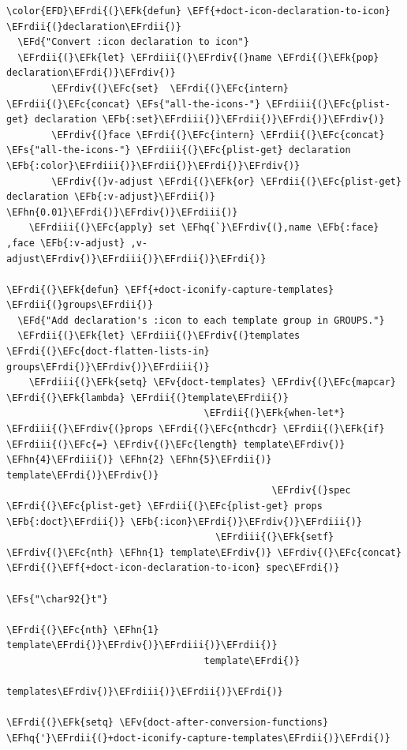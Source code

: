 \documentclass{scrartcl}
\newcommand{\EFk}[1]{\textcolor{EFk}{#1}} %
\newcommand{\EFd}[1]{\textcolor{EFd}{#1}} %
\newcommand{\EFs}[1]{\textcolor{EFs}{#1}} %
\newcommand{\EFb}[1]{\textcolor{EFb}{#1}} %
\newcommand{\EFc}[1]{\textcolor{EFc}{#1}} %
\newcommand{\EFv}[1]{\textcolor{EFv}{#1}} %
\newcommand{\EFf}[1]{\textcolor{EFf}{#1}} %
\newcommand{\EFhn}[1]{#1} %
\newcommand{\EFhq}[1]{#1} %
\newcommand{\EFrdi}[1]{#1} %
\newcommand{\EFrdii}[1]{#1} %
\newcommand{\EFrdiii}[1]{#1} %
\newcommand{\EFrdiv}[1]{#1} %
\begin{document}
\begin{Code}
\begin{Verbatim}[]
\color{EFD}\EFrdi{(}\EFk{defun} \EFf{+doct-icon-declaration-to-icon} \EFrdii{(}declaration\EFrdii{)}
  \EFd{"Convert :icon declaration to icon"}
  \EFrdii{(}\EFk{let} \EFrdiii{(}\EFrdiv{(}name \EFrdi{(}\EFk{pop} declaration\EFrdi{)}\EFrdiv{)}
        \EFrdiv{(}\EFc{set}  \EFrdi{(}\EFc{intern} \EFrdii{(}\EFc{concat} \EFs{"all-the-icons-"} \EFrdiii{(}\EFc{plist-get} declaration \EFb{:set}\EFrdiii{)}\EFrdii{)}\EFrdi{)}\EFrdiv{)}
        \EFrdiv{(}face \EFrdi{(}\EFc{intern} \EFrdii{(}\EFc{concat} \EFs{"all-the-icons-"} \EFrdiii{(}\EFc{plist-get} declaration \EFb{:color}\EFrdiii{)}\EFrdii{)}\EFrdi{)}\EFrdiv{)}
        \EFrdiv{(}v-adjust \EFrdi{(}\EFk{or} \EFrdii{(}\EFc{plist-get} declaration \EFb{:v-adjust}\EFrdii{)} \EFhn{0.01}\EFrdi{)}\EFrdiv{)}\EFrdiii{)}
    \EFrdiii{(}\EFc{apply} set \EFhq{`}\EFrdiv{(},name \EFb{:face} ,face \EFb{:v-adjust} ,v-adjust\EFrdiv{)}\EFrdiii{)}\EFrdii{)}\EFrdi{)}

\EFrdi{(}\EFk{defun} \EFf{+doct-iconify-capture-templates} \EFrdii{(}groups\EFrdii{)}
  \EFd{"Add declaration's :icon to each template group in GROUPS."}
  \EFrdii{(}\EFk{let} \EFrdiii{(}\EFrdiv{(}templates \EFrdi{(}\EFc{doct-flatten-lists-in} groups\EFrdi{)}\EFrdiv{)}\EFrdiii{)}
    \EFrdiii{(}\EFk{setq} \EFv{doct-templates} \EFrdiv{(}\EFc{mapcar} \EFrdi{(}\EFk{lambda} \EFrdii{(}template\EFrdii{)}
                                   \EFrdii{(}\EFk{when-let*} \EFrdiii{(}\EFrdiv{(}props \EFrdi{(}\EFc{nthcdr} \EFrdii{(}\EFk{if} \EFrdiii{(}\EFc{=} \EFrdiv{(}\EFc{length} template\EFrdiv{)} \EFhn{4}\EFrdiii{)} \EFhn{2} \EFhn{5}\EFrdii{)} template\EFrdi{)}\EFrdiv{)}
                                               \EFrdiv{(}spec \EFrdi{(}\EFc{plist-get} \EFrdii{(}\EFc{plist-get} props \EFb{:doct}\EFrdii{)} \EFb{:icon}\EFrdi{)}\EFrdiv{)}\EFrdiii{)}
                                     \EFrdiii{(}\EFk{setf} \EFrdiv{(}\EFc{nth} \EFhn{1} template\EFrdiv{)} \EFrdiv{(}\EFc{concat} \EFrdi{(}\EFf{+doct-icon-declaration-to-icon} spec\EFrdi{)}
                                                                    \EFs{"\char92{}t"}
                                                                    \EFrdi{(}\EFc{nth} \EFhn{1} template\EFrdi{)}\EFrdiv{)}\EFrdiii{)}\EFrdii{)}
                                   template\EFrdi{)}
                                 templates\EFrdiv{)}\EFrdiii{)}\EFrdii{)}\EFrdi{)}

\EFrdi{(}\EFk{setq} \EFv{doct-after-conversion-functions} \EFhq{'}\EFrdii{(}+doct-iconify-capture-templates\EFrdii{)}\EFrdi{)}
\end{Verbatim}
\end{Code}
\end{document}
